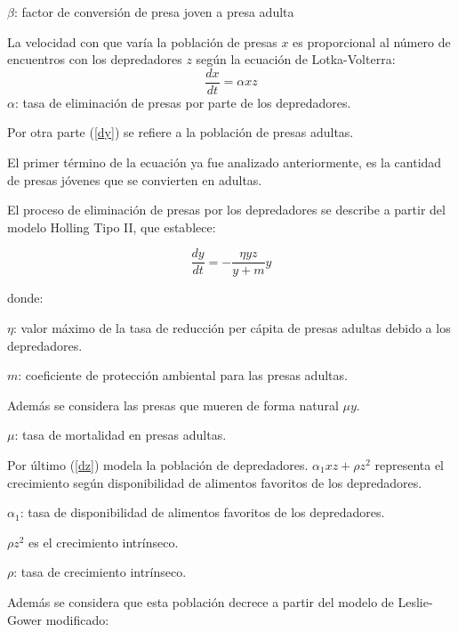 \documentclass{wscpaperproc}
\theoremstyle{wsc}
\begin{document}
\vspace*{0.3cm}

$\beta$: factor de conversión de presa joven a presa adulta

\vspace*{0.3cm}

La velocidad con que varía la población de presas $x$ es proporcional al número de encuentros con los depredadores $z$ según la ecuación de Lotka-Volterra:
$$\frac{dx}{dt}=\alpha xz$$
$\alpha$: tasa de eliminación de presas por parte de los depredadores.

\vspace*{1cm}

Por otra parte (\ref*{dy}) se refiere a la población de presas adultas.

El primer término de la ecuación ya fue analizado anteriormente, es la cantidad de presas jóvenes que se convierten en adultas.

El proceso de eliminación de presas por los depredadores se describe a partir del modelo Holling Tipo II, que establece:

$$\frac{dy}{dt} = -\frac{\eta yz}{y+m}y$$

donde:

$\eta$: valor máximo de la tasa de reducción per cápita de presas adultas debido a los depredadores.

$m$: coeficiente de protección ambiental para las presas adultas.

Además se considera las presas que mueren de forma natural $\mu y$.

$\mu$: tasa de mortalidad en presas adultas.


\vspace*{1cm}

Por último (\ref*{dz}) modela la población de depredadores. $\alpha_1 xz+\rho z^2$ representa el crecimiento según disponibilidad de alimentos favoritos de los depredadores.

$\alpha_1$: tasa de disponibilidad de alimentos favoritos de los depredadores.

\vspace*{0.3cm}

$\rho z^2$ es el crecimiento intrínseco.

$\rho$: tasa de crecimiento intrínseco.

\vspace*{0.3cm}

Además se considera que esta población decrece a partir del modelo de Leslie-Gower modificado:
\end{document}
